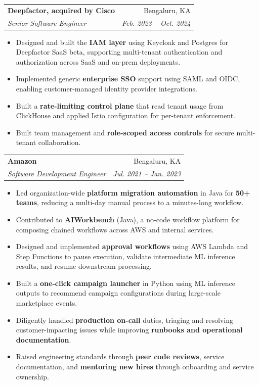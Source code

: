 \documentclass[letterpaper,10pt]{article}
\makeatletter
\newenvironment{resumeList}{
  \begin{itemize}[
    leftmargin=0.22in,
    label=\textbullet,
    itemsep=2pt,
    topsep=2.5pt,
    parsep=0pt,
    partopsep=0pt
  ]
}{
  \end{itemize}
  \vspace{0pt}
}
\newcommand{\resumeSubheading}[4]{
  \vspace{3pt}
  \begin{tabular*}{\textwidth}{l@{\extracolsep{\fill}}r}
    \textbf{#1} & #2 \\
    \textit{#3} & \textit{#4} \\
  \end{tabular*}
  \vspace{-5pt}
}
\makeatother
\begin{document}
\resumeSubheading
  {Deepfactor, acquired by Cisco}{Bengaluru, KA}
  {Senior Software Engineer}{Feb. 2023 -- Oct. 2024}
\begin{resumeList}
  \item Designed and built the \textbf{IAM layer} using Keycloak and Postgres for Deepfactor SaaS beta, supporting multi-tenant authentication and authorization across SaaS and on-prem deployments.
  \item Implemented generic \textbf{enterprise SSO} support using SAML and OIDC, enabling customer-managed identity provider integrations.
  \item Built a \textbf{rate-limiting control plane} that read tenant usage from ClickHouse and applied Istio configuration for per-tenant enforcement.
  \item Built team management and \textbf{role-scoped access controls} for secure multi-tenant collaboration.
\end{resumeList}

\resumeSubheading
  {Amazon}{Bengaluru, KA}
  {Software Development Engineer}{Jul. 2021 -- Jan. 2023}
\begin{resumeList}
  \item Led organization-wide \textbf{platform migration automation} in Java for \textbf{50+ teams}, reducing a multi-day manual process to a minutes-long workflow.
  \item Contributed to \textbf{AIWorkbench} (Java), a no-code workflow platform for composing chained workflows across AWS and internal services.
  \item Designed and implemented \textbf{approval workflows} using AWS Lambda and Step Functions to pause execution, validate intermediate ML inference results, and resume downstream processing.
  \item Built a \textbf{one-click campaign launcher} in Python using ML inference outputs to recommend campaign configurations during large-scale marketplace events.
  \item Diligently handled \textbf{production on-call} duties, triaging and resolving customer-impacting issues while improving \textbf{runbooks and operational documentation}.
  \item Raised engineering standards through \textbf{peer code reviews}, service documentation, and \textbf{mentoring new hires} through onboarding and service ownership.
\end{resumeList}
\end{document}
